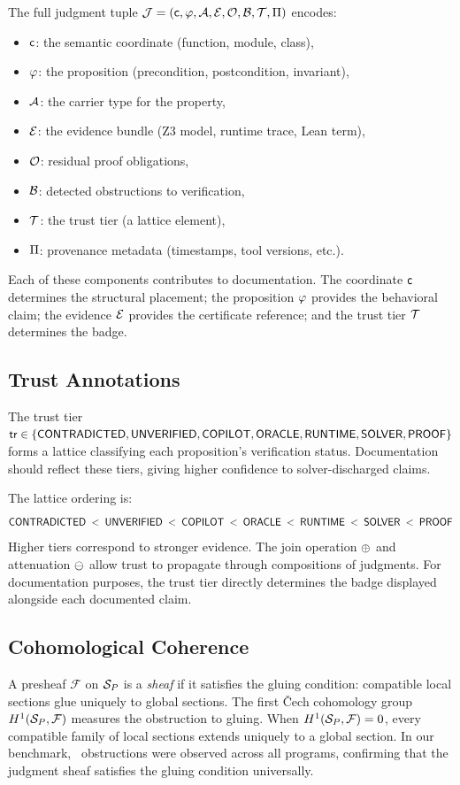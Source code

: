 \documentclass[11pt]{article}
\newcommand{\tr}{\mathsf{tr}}                        %
\begin{document}
The full judgment tuple
$\mathcal{J} = (\mathsf{c}, \varphi, \mathcal{A}, \mathcal{E}, \mathcal{O}, \mathcal{B}, \mathcal{T}, \Pi)$
encodes:
\begin{itemize}[noitemsep]
\item $\mathsf{c}$: the semantic coordinate (function, module, class),
\item $\varphi$: the proposition (precondition, postcondition, invariant),
\item $\mathcal{A}$: the carrier type for the property,
\item $\mathcal{E}$: the evidence bundle (Z3 model, runtime trace, Lean term),
\item $\mathcal{O}$: residual proof obligations,
\item $\mathcal{B}$: detected obstructions to verification,
\item $\mathcal{T}$: the trust tier (a lattice element),
\item $\Pi$: provenance metadata (timestamps, tool versions, etc.).
\end{itemize}
Each of these components contributes to documentation.  The coordinate
$\mathsf{c}$ determines the structural placement; the proposition $\varphi$
provides the behavioral claim; the evidence $\mathcal{E}$ provides the
certificate reference; and the trust tier $\mathcal{T}$ determines the
badge.

\subsection{Trust Annotations}
The trust tier $\tr \in \{\Tcontra, \Tunver, \Tcopilot, \Toracle,
\Truntime, \Tsolver, \Tproof\}$ forms a lattice classifying each
proposition's verification status.  Documentation should reflect these
tiers, giving higher confidence to solver-discharged claims.

The lattice ordering is:
\[
  \mathsf{CONTRADICTED} \;<\; \mathsf{UNVERIFIED} \;<\; \mathsf{COPILOT} \;<\; \mathsf{ORACLE}
  \;<\; \mathsf{RUNTIME} \;<\; \mathsf{SOLVER} \;<\; \mathsf{PROOF}
\]
Higher tiers correspond to stronger evidence.  The join operation
$\oplus$ and attenuation $\ominus$ allow trust to propagate through
compositions of judgments.  For documentation purposes, the trust tier
directly determines the badge displayed alongside each documented claim.

\subsection{Cohomological Coherence}
A presheaf $\mathcal{F}$ on $\mathcal{S}_P$ is a \emph{sheaf} if it satisfies
the gluing condition: compatible local sections glue uniquely to global
sections.  The first \v{C}ech cohomology group $H^{1}(\mathcal{S}_P,
\mathcal{F})$ measures the obstruction to gluing.  When
$H^{1}(\mathcal{S}_P, \mathcal{F}) = 0$, every compatible family of local
sections extends uniquely to a global section.  In our benchmark,
\compObstructionTotal\ obstructions were observed across all programs,
confirming that the judgment sheaf satisfies the gluing condition
universally.
\end{document}
